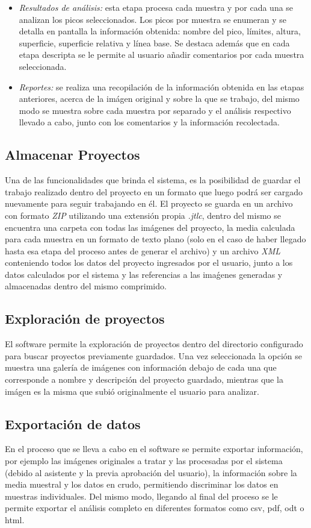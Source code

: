 \begin{itemize}
	\item \textit{Resultados de an\'alisis:} esta etapa procesa cada muestra y por cada una se analizan los picos seleccionados. Los picos por muestra se enumeran y se detalla en pantalla la informaci\'on obtenida: nombre del pico, l\'imites, altura, superficie, superficie relativa y l\'inea base. Se destaca adem\'as que en cada etapa descripta se le permite al usuario a\~nadir comentarios por cada muestra seleccionada.
	\item \textit{Reportes:} se realiza una recopilaci\'on de la informaci\'on obtenida en las etapas anteriores, acerca de la im\'agen original y sobre la que se trabajo, del mismo modo se muestra sobre cada muestra por separado y el an\'alisis respectivo llevado a cabo, junto con los comentarios y la informaci\'on recolectada.
\end{itemize}

\subsection{Almacenar Proyectos}
Una de las funcionalidades que brinda el sistema, es la posibilidad de guardar el trabajo realizado dentro del proyecto en un formato que luego podr\'a ser cargado nuevamente para seguir trabajando en \'el. El proyecto se guarda en un archivo con formato \textit{ZIP} utilizando una extensi\'on propia \textit{.jtlc}, dentro del mismo se encuentra una carpeta con todas las im\'agenes del proyecto, la media calculada para cada muestra en un formato de texto plano (solo en el caso de haber llegado hasta esa etapa del proceso antes de generar el archivo) y un archivo \textit{XML} conteniendo todos los datos del proyecto ingresados por el usuario, junto a los datos calculados por el sistema y las referencias a las ima\'genes generadas y almacenadas dentro del mismo comprimido.

\subsection{Exploraci\'on de proyectos}
El software permite la exploraci\'on de proyectos dentro del directorio configurado para buscar proyectos previamente guardados. Una vez seleccionada la opci\'on se muestra una galer\'ia de im\'agenes con informaci\'on debajo de cada una que corresponde a nombre y descripci\'on del proyecto guardado, mientras que la im\'agen es la misma que subi\'o originalmente el usuario para analizar.

\subsection{Exportaci\'on de datos}
En el proceso que se lleva a cabo en el software se permite exportar informaci\'on, por ejemplo las im\'agenes originales a tratar y las procesadas por el sistema (debido al asistente y la previa aprobaci\'on del usuario), la informaci\'on sobre la media muestral y los datos en crudo, permitiendo discriminar los datos en muestras individuales. Del mismo modo, llegando al final del proceso se le permite exportar el an\'alisis completo en diferentes formatos como csv, pdf, odt o html.

